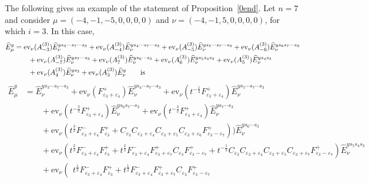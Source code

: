 \documentclass[11pt]{article}
\theoremstyle{plain}
\theoremstyle{definition}
\newenvironment{example}
  {\pushQED{\qed}\exampleinner}
  {\popQED\endexampleinner}
\theoremstyle{remark}
\numberwithin{equation}{section}
\def\ev{\mathrm{ev}}
\newcounter{r}
\newcounter{s}
\begin{document}
The following gives an example of the statement of Proposition~\ref{0end}.
\begin{example} \label{0endexample}
Let $n=7$ and consider 
$\mu = (-4,-1, -5, 0, 0, 0, 0)$ and $\nu = (-4,-1,5, 0,0,0,0)$, for which $i=3$. 
In this case,
\begin{align*}
\widehat{E}^{y}_\mu
&=\ev_\nu(A^{(3)}_{-3}) \widehat{E}^{ys_3\cdots s_7\cdots s_3}_\nu
+\ev_\nu(A^{(3)}_{-4})\widehat{E}^{ys_4\cdots s_7\cdots s_3}_\nu
+\ev_\nu(A^{(3)}_{-5}) \widehat{E}^{ys_5\cdots s_7\cdots s_3}_\nu
+\ev_\nu(A^{(3)}_{-6}) \widehat{E}^{ys_6 s_7\cdots s_3}_\nu
\\
&\qquad
+\ev_\nu(A^{(3)}_{-7}) \widehat{E}^{y s_7\cdots s_3}_\nu
+\ev_\nu(A^{(3)}_{7})
\widehat{E}^{y s_6\cdots s_3}_\nu
+\ev_\nu(A^{(3)}_{6})
\widehat{E}^{y s_5s_4 s_3}_\nu
+\ev_\nu(A^{(3)}_{5})
\widehat{E}^{y s_4 s_3}_\nu
\\
&\qquad
+\ev_\nu(A^{(3)}_{4})
\widehat{E}^{y s_3}_\nu
+\ev_\nu(A^{(3)}_{3})
\widehat{E}^{y}_\nu\qquad\hbox{is}
\end{align*}
\begin{align*}
\widehat{E}^{y}_\mu
&=\widehat{E}^{ys_3\cdots s_7\cdots s_3}_\nu
+\ev_\nu(F^+_{\varepsilon_3+\varepsilon_4}) \widehat{E}^{ys_4\cdots s_7\cdots s_3}_\nu
+\ev_\nu(t^{-\frac12} F^+_{\varepsilon_3+\varepsilon_4}) \widehat{E}^{ys_5\cdots s_7\cdots s_3}_\nu
\\
&\qquad
+\ev_\nu(t^{-\frac22} F^+_{\varepsilon_3+\varepsilon_4})
\widehat{E}^{ys_6 s_7\cdots s_3}_\nu
+\ev_\nu(t^{-\frac32} F^+_{\varepsilon_3+\varepsilon_4})
\widehat{E}^{y s_7\cdots s_3}_\nu
\\
&\qquad
+\ev_\nu(t^{\frac32} F^-_{\varepsilon_3+\varepsilon_4} F^+_{\varepsilon_3} + C_{\varepsilon_3}C_{\varepsilon_3+\varepsilon_4}C_{\varepsilon_3+\varepsilon_5} C_ {\varepsilon_3+\varepsilon_6} F^+_{\varepsilon_3-\varepsilon_7}))
\widehat{E}^{y s_6\cdots s_3}_\nu
\\
&\qquad
+\ev_\nu(t^{\frac22} F^-_{\varepsilon_3+\varepsilon_4} F^+_{\varepsilon_3} + t^{\frac22} F^-_{\varepsilon_3+\varepsilon_4} F^+_{\varepsilon_3+\varepsilon_7} C_{\varepsilon_3} F^+_{\varepsilon_3-\varepsilon_7} + 
t^{-\frac12} C_{\varepsilon_3}C_{\varepsilon_3+\varepsilon_4}
C_{\varepsilon_3+\varepsilon_5} C_{\varepsilon_3+\varepsilon_7} F^+_{\varepsilon_3-\varepsilon_7})
\widehat{E}^{y s_5s_4 s_3}_\nu
\\
&\qquad
+\ev_\nu\left(
\begin{array}{l}
t^{\frac12}F^-_{\varepsilon_3+\varepsilon_4} F^+_{\varepsilon_3} 
+ t^{\frac12}F^-_{\varepsilon_3+\varepsilon_4} F^+_{\varepsilon_3+\varepsilon_7} C_{\varepsilon_3} F^+_{\varepsilon_3-\varepsilon_7} 

\end{array}
\end{align*}
\end{example}
\end{document}
